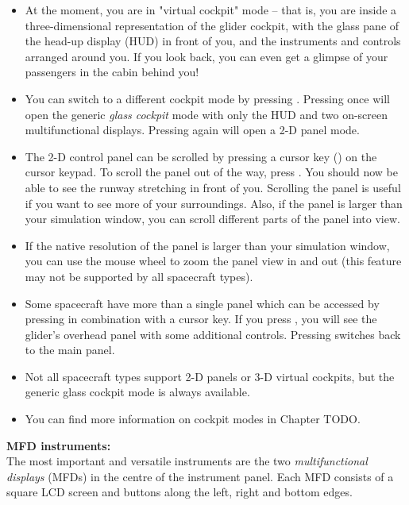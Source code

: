 \documentclass[Orbiter User Manual.tex]{subfiles}
\begin{document}
\begin{itemize}
\item At the moment, you are in "virtual cockpit" mode – that is, you are inside a three-dimensional representation of the glider cockpit, with the glass pane of the head-up display (HUD) in front of you, and the instruments and controls arranged around you. If you look back, you can even get a glimpse of your passengers in the cabin behind you!
\item You can switch to a different cockpit mode by pressing . Pressing  once will open the generic \textit{glass cockpit} mode with only the HUD and two on-screen multifunctional displays. Pressing  again will open a 2-D panel mode.
\item The 2-D control panel can be scrolled by pressing a cursor key (\DArrow\UArrow\RArrow\LArrow) on the cursor keypad. To scroll the panel out of the way, press \UArrow. You should now be able to see the runway stretching in front of you. Scrolling the panel is useful if you want to see more of your surroundings. Also, if the panel is larger than your simulation window, you can scroll different parts of the panel into view.
\item If the native resolution of the panel is larger than your simulation window, you can use the mouse wheel to zoom the panel view in and out (this feature may not be supported by all spacecraft types).
\item Some spacecraft have more than a single panel which can be accessed by pressing \Ctrl in combination with a cursor key. If you press \Ctrl\UArrow, you will see the glider's overhead panel with some additional controls. Pressing \Ctrl\DArrow switches back to the main panel.
\item Not all spacecraft types support 2-D panels or 3-D virtual cockpits, but the generic glass cockpit mode is always available.
\item You can find more information on cockpit modes in Chapter TODO.
\end{itemize}

\noindent
\textbf{MFD instruments:}\\
The most important and versatile instruments are the two \textit{multifunctional displays} (MFDs) in the centre of the instrument panel. Each MFD consists of a square LCD screen and buttons along the left, right and bottom edges.
\end{document}
